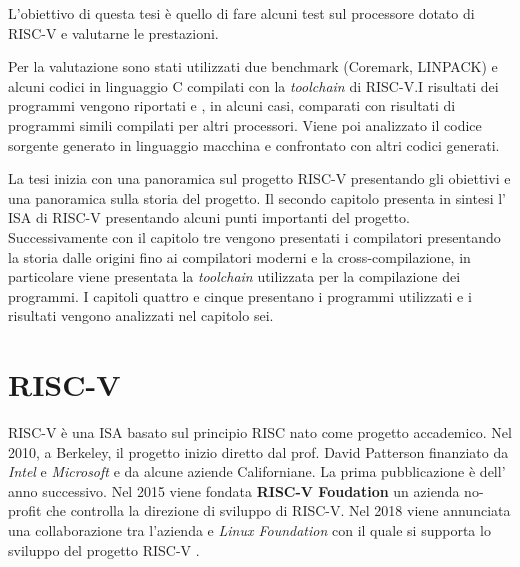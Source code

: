 \documentclass[12pt,a4paper]{report}
\begin{document}
L'obiettivo di questa tesi è quello di fare alcuni test sul processore dotato di RISC-V e valutarne le prestazioni.

Per la valutazione sono stati utilizzati due benchmark (Coremark, LINPACK) e alcuni
codici in linguaggio C compilati con la \textit{toolchain} di RISC-V.I risultati dei programmi vengono riportati e , in alcuni casi, comparati con risultati di programmi simili compilati per altri processori. Viene poi analizzato il codice sorgente generato in linguaggio macchina e confrontato con altri codici generati.

La tesi inizia con una panoramica sul progetto RISC-V presentando gli obiettivi e una panoramica sulla storia del progetto. Il secondo capitolo presenta in sintesi l' ISA di RISC-V presentando alcuni punti importanti del progetto. Successivamente con il capitolo tre vengono presentati i compilatori presentando la storia dalle origini fino ai compilatori moderni e la cross-compilazione,  in particolare viene presentata la \textit{toolchain} utilizzata per la compilazione dei programmi.
I capitoli quattro e cinque presentano i programmi utilizzati e i risultati vengono analizzati nel capitolo sei.




\chapter{RISC-V}
RISC-V è una ISA basato sul principio RISC nato come progetto accademico.  Nel 2010, a Berkeley, il progetto inizio diretto dal prof. David Patterson finanziato da \textit{Intel } e \textit{Microsoft} e da alcune aziende Californiane. La prima pubblicazione è dell' anno successivo. Nel 2015 viene fondata  \textbf{RISC-V Foudation} un azienda no-profit che controlla la direzione di sviluppo di RISC-V. Nel 2018 viene annunciata una collaborazione tra l'azienda e \textit{Linux Foundation} con il quale si supporta lo sviluppo del progetto RISC-V \cite{RISCOrgHistory}.
\end{document}
